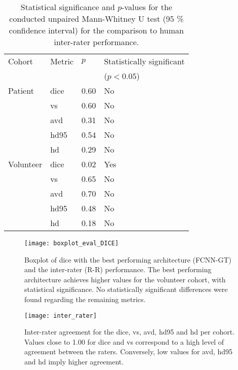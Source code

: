 \begin{table}[htbp]
   \centering
   \caption[Statistics for Comparison to Inter-Rater Performance]{Statistical significance and $p$-values for the conducted unpaired Mann-Whitney U test (95 \% confidence interval) for the comparison to human inter-rater performance.}
   \begin{tabular}{l*{3}{l}}
      \toprule
        Cohort	    & Metric        & $p$       & Statistically significant\\
      			    &               &           &($p < 0.05$)          \\
      \midrule
        Patient     & \gls{dice}    & 0.60      & No\\
                    & \gls{vs}      & 0.60      & No\\
                    & \gls{avd}     & 0.31      & No\\
                    & \gls{hd95}    & 0.54      & No\\
                    & \gls{hd}      & 0.29      & No\\
        \midrule
        Volunteer   & \gls{dice}    & 0.02      & Yes\\
                    & \gls{vs}      & 0.65      & No\\
                    & \gls{avd}     & 0.70      & No\\
                    & \gls{hd95}    & 0.48      & No\\
                    & \gls{hd}      & 0.18      & No\\
      \bottomrule
   \end{tabular}
   \label{tab:res_fcnn_rater_statistics}
\end{table}

\begin{figure}[htbp]
	\centering
	\texttt{[image: boxplot\_eval\_DICE]}
    \caption[Boxplot of the \glsdesc{dice} for Comparison to Inter-rater Performance]{Boxplot of \acrlong{dice} with the best performing architecture (FCNN-GT) and the inter-rater (R-R) performance. The best performing architecture achieves higher values for the volunteer cohort, with statistical significance. No statistically significant differences were found regarding the remaining metrics.}
    \label{fig:results_eval_boxplot_dice}
\end{figure}

\begin{figure}[htbp]	
	\texttt{[image: inter\_rater]}
    \caption[Heatmap for Inter-Rater Agreement]{Inter-rater agreement for the \acrlong{dice}, \acrlong{vs}, \acrlong{avd}, \acrlong{hd95} and \acrlong{hd} per cohort. Values close to 1.00 for \gls{dice} and \gls{vs} correspond to a high level of agreement between the raters. Conversely, low values for \gls{avd}, \gls{hd95} and \gls{hd} imply higher agreement.}
    \label{fig:res_inter_rater}
\end{figure}


